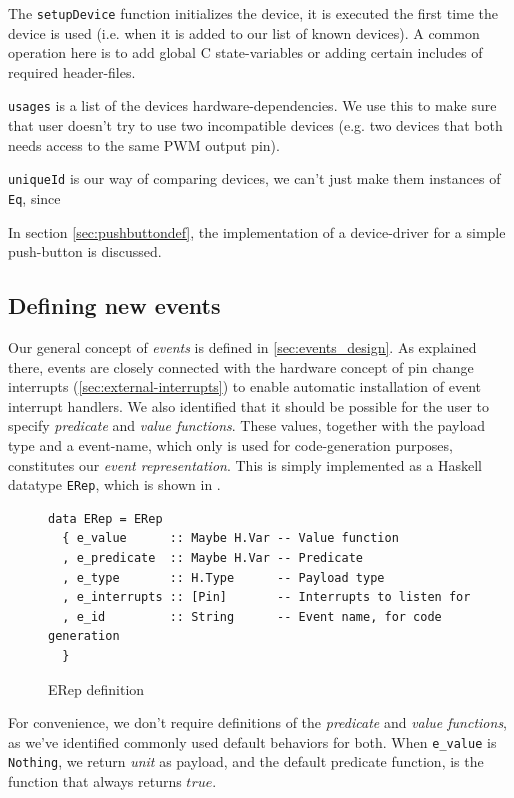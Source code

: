 \documentclass[a4paper, oneside, final]{memoir}
\let\Fref\undefined
\begin{document}
The \texttt{setupDevice} function initializes the device, it is
executed the first time the device is used (i.e. when it is added to
our list of known devices). A common operation here is to add global C
state-variables or adding certain includes of required header-files.

\texttt{usages} is a list of the devices hardware-dependencies. We use
this to make sure that user doesn't try to use two incompatible
devices (e.g. two devices that both needs access to the same PWM
output pin). 

\texttt{uniqueId} is our way of comparing devices, we can't just make
them instances of \texttt{Eq}, since

In section \ref{sec:pushbuttondef}, the implementation of a
device-driver for a simple push-button is discussed.


\subsection{Defining new events}
\label{sec:defining events}
Our general concept of \textit{events} is defined in
\ref{sec:events_design}. As explained there, events are closely
connected with the hardware concept of pin change interrupts
(\ref{sec:external-interrupts}) to enable automatic installation of event
interrupt handlers. We also identified that it should be possible for
the user to specify \textit{predicate} and \textit{value functions}. 
These values, together with the payload type and a event-name, which
only is used for code-generation purposes, constitutes our
\textit{event representation}. This is simply implemented as a Haskell
datatype \verb|ERep|, which is shown in \Fref{fig:Erep}. 

\begin{figure}
  \centering
\begin{verbatim}
data ERep = ERep
  { e_value      :: Maybe H.Var -- Value function
  , e_predicate  :: Maybe H.Var -- Predicate
  , e_type       :: H.Type      -- Payload type
  , e_interrupts :: [Pin]       -- Interrupts to listen for
  , e_id         :: String      -- Event name, for code generation
  }
\end{verbatim}

  \caption{ERep definition}
  \label{fig:Erep}
\end{figure}

For convenience, we don't require definitions of the
\textit{predicate} and \textit{value functions}, as we've identified
commonly used default behaviors for both. When \verb|e_value| is
\verb|Nothing|, we return \textit{unit} as payload, and the default
predicate function, is the function that always returns $true$.
\end{document}

